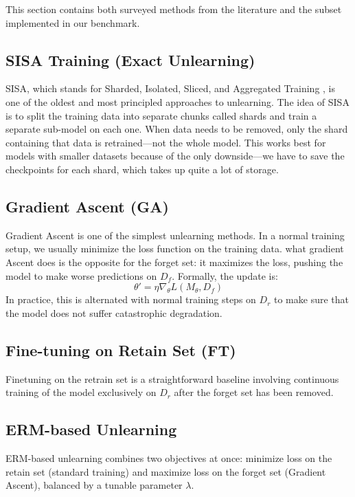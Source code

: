 \documentclass[conference]{IEEEtran}
\begin{document}
This section contains both surveyed methods from the literature and the subset implemented in our benchmark.



\subsection{SISA Training (Exact Unlearning)}\label{AA}
SISA, which stands for Sharded, Isolated, Sliced, and Aggregated Training \cite{bourtoule2021}, is one of the oldest and most principled approaches  to unlearning. The idea of SISA is to split the training data into separate chunks called shards and train a separate sub-model on each one. When data needs to be removed, only the shard containing that data is retrained—not the whole model. This works best for models with smaller datasets because of the only downside—we have to save the checkpoints for each shard, which takes up quite a lot of storage. 

\subsection{Gradient Ascent (GA)}
Gradient Ascent \cite{graves2021} is one of the simplest unlearning methods. In a normal training setup, we usually minimize the loss function on the training data. what gradient Ascent does is the opposite for the forget set: it maximizes the loss, pushing the model to make worse predictions on \(D_f\). Formally, the update is:
\begin{equation}
\theta' = \eta \nabla_\theta L(M_\theta, D_f)\label{eq}
\end{equation}
In practice, this is alternated with normal training steps on \(D_r\) to make sure that  the model does not suffer catastrophic degradation.


\subsection{Fine-tuning on Retain Set (FT)}
Finetuning on the retrain set is a straightforward baseline involving continuous training of the model exclusively on \(D_r\) after the forget set has been removed.

\subsection{ERM-based Unlearning}
ERM-based unlearning \cite{chundawat2023} combines two objectives at once: minimize loss on the retain set (standard training) and maximize loss on the forget set (Gradient Ascent), balanced by a tunable parameter \(\lambda\).
\end{document}
